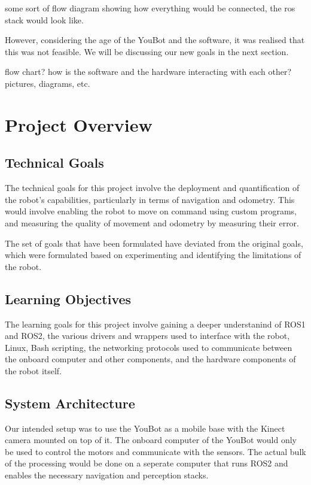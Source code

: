 \documentclass[a4paper, 12pt]{article}
\begin{document}
    some sort of flow diagram showing how everything would be connected, the ros stack would look like.


    However, considering the age of the YouBot and the software, it was realised that this was not feasible. We will be discussing our new goals in the next section. 



    flow chart? how is the software and the hardware interacting with each other? pictures, diagrams, etc. 

    \pagebreak
    
    \section{Project Overview}

    

    \subsection{Technical Goals}

    The technical goals for this project involve the deployment and quantification of the robot's capabilities, particularly in terms of navigation and odometry. This would involve enabling the robot to move on command using custom programs, and measuring the quality of movement and odometry by measuring their error. 

    
    The set of goals that have been formulated have deviated from the original goals, which were formulated based on experimenting and identifying the limitations of the robot. 

    \subsection{Learning Objectives}
    The learning goals for this project involve gaining a deeper understanind of ROS1 and ROS2, the various drivers and wrappers used to interface with the robot, Linux, Bash scripting, the networking protocols used to communicate between the onboard computer and other components, and the hardware components of the robot itself. 

    \subsection{System Architecture}
    Our intended setup was to use the YouBot as a mobile base with the Kinect camera mounted on top of it. The onboard computer of the YouBot would only be used to control the motors and communicate with the sensors. The actual bulk of the processing would be done on a seperate computer that runs ROS2 and enables the necessary navigation and perception stacks.  
\end{document}
